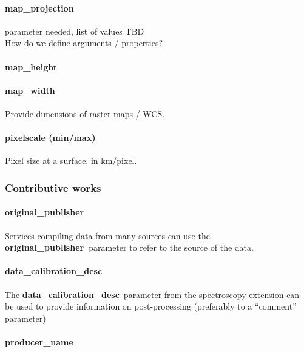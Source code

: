 \documentclass[11pt,a4paper]{ivoa}
\begin{document}
\paragraph{map\_projection}

parameter needed, list of values TBD\\How do we define arguments / properties?

\paragraph{map\_height}

\paragraph{map\_width}

Provide dimensions of raster maps / WCS.

\paragraph{pixelscale (min/max)}

Pixel size at a surface, in km/pixel.

\subsubsection{Contributive works\\}

\paragraph{original\_publisher}

Services compiling data from many sources can use the \textbf{original\_publisher }parameter to refer to the source of the data.

\paragraph{data\_calibration\_desc}

The\textbf{ \textbf{data\_calibration\_desc}} parameter from the spectroscopy extension can be used to provide information on post-processing (preferably to a ``comment'' parameter)

\paragraph{producer\_name}
\end{document}
